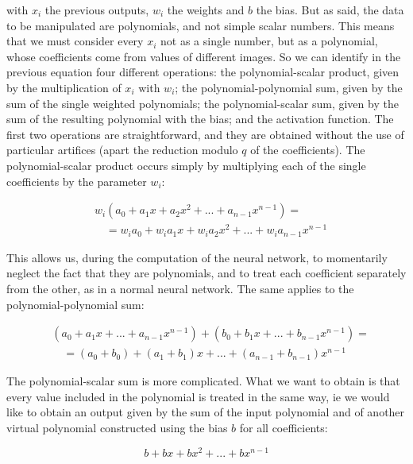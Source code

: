 \noindent with $x_i$ the previous outputs, $w_i$ the weights and $b$ the bias. But as said, the data to be manipulated are polynomials, and not simple scalar numbers. This means that we must consider every $x_i$ not as a single number, but as a polynomial, whose coefficients come from values of different images. So we can identify in the previous equation four different operations: the polynomial-scalar product, given by the multiplication of $x_i$ with $w_i$; the polynomial-polynomial sum, given by the sum of the single weighted polynomials; the polynomial-scalar sum, given by the sum of the resulting polynomial with the bias; and the activation function. The first two operations are straightforward, and they are obtained without the use of particular artifices (apart the reduction modulo $q$ of the coefficients). The polynomial-scalar product occurs simply by multiplying each of the single coefficients by the parameter $w_i$:

\begin{align*}
    &w_i(a_0+a_1x+a_2x^2+...+a_{n-1}x^{n-1}) =\\
    &\quad = w_ia_0+w_ia_1x+w_ia_2x^2+...+w_ia_{n-1}x^{n-1}
\end{align*}


This allows us, during the computation of the neural network, to momentarily neglect the fact that they are polynomials, and to treat each coefficient separately from the other, as in a normal neural network. The same applies to the polynomial-polynomial sum:

\begin{align*}
    &(a_0+a_1x+...+a_{n-1}x^{n-1})+(b_0+b_1x+...+b_{n-1}x^{n-1}) =\\
    &\quad = (a_0+b_0)+(a_1+b_1)x+...+(a_{n-1}+b_{n-1})x^{n-1}
\end{align*}


The polynomial-scalar sum is more complicated. What we want to obtain is that every value included in the polynomial is treated in the same way, ie we would like to obtain an output given by the sum of the input polynomial and of another virtual polynomial constructed using the bias $b$ for all coefficients:

\begin{equation*}
    b+bx+bx^2+...+bx^{n-1}
\end{equation*}

